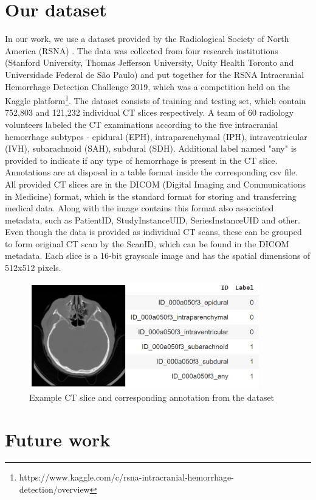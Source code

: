 \section{Our dataset}
In our work, we use a dataset provided by the Radiological Society of North America (RSNA)  \cite{RSNAchallenge}. The data was collected from four research institutions (Stanford University, Thomas Jefferson University, Unity Health Toronto and Universidade Federal de São Paulo) and put together for the RSNA Intracranial Hemorrhage Detection Challenge 2019, which was a competition held on the Kaggle platform\footnote{https://www.kaggle.com/c/rsna-intracranial-hemorrhage-detection/overview}. The dataset consists of training and testing set, which contain 752,803 and 121,232 individual CT slices respectively. A team of 60 radiology volunteers labeled the CT examinations according to the five intracranial hemorrhage subtypes - epidural (EPH), intraparenchymal (IPH), intraventricular (IVH), subarachnoid (SAH), subdural (SDH). Additional label named "any" is provided to indicate if any type of hemorrhage is present in the CT slice. Annotations are at disposal in a table format inside the corresponding csv file. All provided CT slices are in the DICOM (Digital Imaging and Communications in Medicine) format, which is the standard format for storing and transferring medical data. Along with the image contains this format also associated metadata, such as PatientID, StudyInstanceUID, SeriesInstanceUID and other. Even though the data is provided as individual CT scans, these can be grouped to form original CT scan by the ScanID, which can be found in the DICOM metadata. Each slice is a 16-bit grayscale image and has the spatial dimensions of 512x512 pixels. 
\begin{figure}[!ht]
\begin{centering}
\includegraphics[width=10cm]{assets/images/datasetExample}
\par\end{centering}
\caption{Example CT slice and corresponding annotation from the dataset \label{fig:dataset}}
\end{figure}

\section{Future work}
